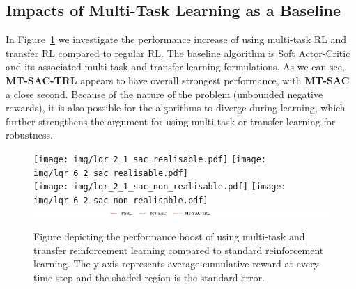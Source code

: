 \subsection{Impacts of Multi-Task Learning as a Baseline}
In Figure~\ref{fig:sac_results} we investigate the performance increase of using multi-task RL and transfer RL compared to regular RL. The baseline algorithm is Soft Actor-Critic and its associated multi-task and transfer learning formulations. As we can see, \textbf{MT-SAC-TRL} appears to have overall strongest performance, with \textbf{MT-SAC} a close second. Because of the nature of the problem (unbounded negative rewards), it is also possible for the algorithms to diverge during learning, which further strengthens the argument for using multi-task or transfer learning for robustness.
\begin{figure}[h!]
    \centering
    \texttt{[image: img/lqr\_2\_1\_sac\_realisable.pdf]} %
    \texttt{[image: img/lqr\_6\_2\_sac\_realisable.pdf]}\\
    \texttt{[image: img/lqr\_2\_1\_sac\_non\_realisable.pdf]} %
    \texttt{[image: img/lqr\_6\_2\_sac\_non\_realisable.pdf]}\\
    \includegraphics[width=.5\textwidth]{img/lqr_legend2.pdf}
    \caption{Figure depicting the performance boost of using multi-task and transfer reinforcement learning compared to standard reinforcement learning. The y-axis represents average cumulative reward at every time step and the shaded region is the standard error.}
    \label{fig:sac_results}
\end{figure}


\newpage
